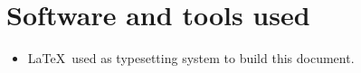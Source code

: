 \section{Software and tools used}
\begin{itemize}
    \item \LaTeX\, used as typesetting system to build this document.
\end{itemize}
